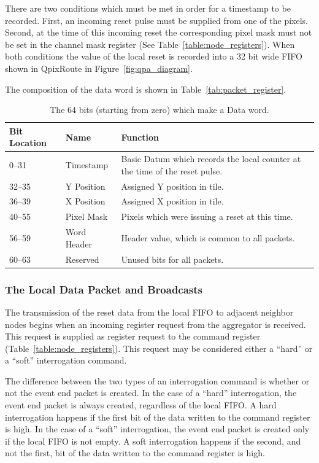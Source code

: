 There are two conditions which must be met in order for a timestamp to be recorded.
First, an incoming reset pulse must be supplied from one of the pixels.
Second, at the time of this incoming reset the corresponding pixel mask must not be set in the channel mask register (See Table~\ref{table:node_registers}).
When both conditions the value of the local reset is recorded into a 32 bit wide FIFO shown in QpixRoute in Figure~\ref{fig:qpa_diagram}.

The composition of the data word is shown in Table~\ref{tab:packet_register}.
\begin{table}
\begin{center}
\begin{tabular}{|| p{30mm} | p{30mm} | p{90mm} ||}
 \hline
 Bit Location & Name & Function \\ [0.5ex]
 \hline\hline
  0--31 & Timestamp & Basic Datum which records the local counter at the time of the reset pulse. \\
 \hline
  32--35 & Y Position & Assigned Y position in tile. \\
 \hline
  36--39 & X Position & Assigned X position in tile. \\
 \hline
  40--55 & Pixel Mask & Pixels which were issuing a reset at this time. \\
 \hline
  56--59 & Word Header & Header value, which is common to all packets. \\
 \hline
  60--63 & Reserved & Unused bits for all packets. \\
 \hline
\end{tabular}
\caption{The 64 bits (starting from zero) which make a Data word.}
\label{tab:packet_data}
\end{center}
\end{table}

\subsubsection{The Local Data Packet and Broadcasts}
\label{sec:local_data_packet}
The transmission of the reset data from the local FIFO to adjacent neighbor nodes begins when an incoming register request from the aggregator is received.
This request is supplied as register request to the command register (Table~\ref{table:node_registers}).
This request may be considered either a ``hard'' or a ``soft'' interrogation command.

The difference between the two types of an interrogation command is whether or not the event end packet is created.
In the case of a ``hard'' interrogation, the event end packet is always created, regardless of the local FIFO.
A hard interrogation happens if the first bit of the data written to the command register is high.
In the case of a ``soft'' interrogation, the event end packet is created only if the local FIFO is not empty.
A soft interrogation happens if the second, and not the first, bit of the data written to the command register is high.

